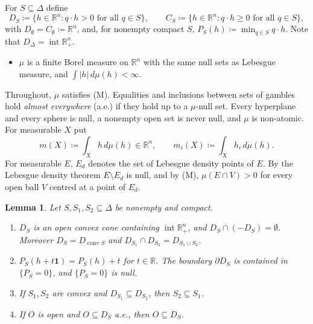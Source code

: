 \documentclass[11pt]{article}
\newcommand{\R}{\mathbb{R}}
\newcommand{\one}{\mathbf{1}}
\newcommand{\Rpp}{\inter\R^n_{+}}
\DeclareMathOperator{\conv}{conv}
\DeclareMathOperator{\inter}{int}
\theoremstyle{plain}
\newtheorem{lemma}[theorem]{Lemma}
\theoremstyle{definition}
\theoremstyle{remark}
\begin{document}
For $S\subseteq\Delta$ define
\[
  D_S\coloneqq\{h\in\R^n: q\cdot h>0\text{ for all }q\in S\},\qquad
  C_S\coloneqq\{h\in\R^n: q\cdot h\ge0\text{ for all }q\in S\},
\]
with $D_\emptyset=C_\emptyset\coloneqq\R^n$, and, for nonempty compact $S$,
$P_S(h)\coloneqq\min_{q\in S}q\cdot h$. Note that $D_\Delta=\Rpp$.

\begin{itemize}
  \item[(M)] $\mu$ is a finite Borel measure on $\R^n$ with the same null sets as Lebesgue
  measure, and $\int|h|\,d\mu(h)<\infty$.
\end{itemize}
Throughout, $\mu$ satisfies (M). Equalities and inclusions between sets of gambles hold
\emph{almost everywhere} (a.e.) if they hold up to a $\mu$-null set. Every hyperplane and
every sphere is null, a nonempty open set is never null, and $\mu$ is non-atomic. For
measurable $X$ put
\[
  m(X)\coloneqq\int_Xh\,d\mu(h)\in\R^n,\qquad m_i(X)\coloneqq\int_Xh_i\,d\mu(h).
\]
For measurable $E$, $E_d$ denotes the set of Lebesgue density points of $E$. By the
Lebesgue density theorem $E\setminus E_d$ is null, and by (M), $\mu(E\cap V)>0$ for every
open ball $V$ centred at a point of $E_d$.

\begin{lemma}\label{lem:D}
Let $S,S_1,S_2\subseteq\Delta$ be nonempty and compact.
\begin{enumerate}[label=(\alph*)]
  \item $D_S$ is an open convex cone containing $\Rpp$, and $D_S\cap(-D_S)=\emptyset$.
  Moreover $D_S=D_{\conv S}$ and $D_{S_1}\cap D_{S_2}=D_{S_1\cup S_2}$.
  \item $P_S(h+t\one)=P_S(h)+t$ for $t\in\R$. The boundary $\partial D_S$ is contained in
  $\{P_S=0\}$, and $\{P_S=0\}$ is null.
  \item If $S_1,S_2$ are convex and $D_{S_1}\subseteq D_{S_2}$, then $S_2\subseteq S_1$.
  \item If $O$ is open and $O\subseteq D_S$ a.e., then $O\subseteq D_S$.
\end{enumerate}
\end{lemma}
\end{document}
